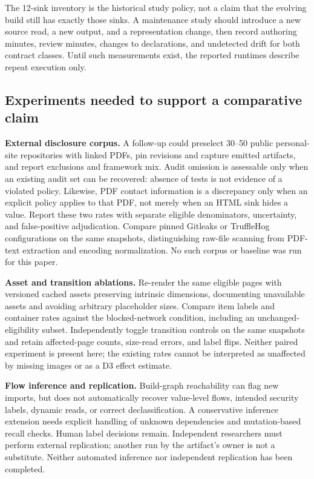 \documentclass[acmsmall,screen,review,anonymous,nonacm]{acmart}
\begin{document}
The 12-sink inventory is the historical study policy, not a claim that the evolving build still has exactly those sinks. A maintenance study should introduce a new source read, a new output, and a representation change, then record authoring minutes, review minutes, changes to declarations, and undetected drift for both contract classes. Until such measurements exist, the reported runtimes describe repeat execution only.

\subsection{Experiments needed to support a comparative claim}
\textbf{External disclosure corpus.} A follow-up could preselect 30--50 public personal-site repositories with linked PDFs, pin revisions and capture emitted artifacts, and report exclusions and framework mix. Audit omission is assessable only when an existing audit set can be recovered: absence of tests is not evidence of a violated policy. Likewise, PDF contact information is a discrepancy only when an explicit policy applies to that PDF, not merely when an HTML sink hides a value. Report these two rates with separate eligible denominators, uncertainty, and false-positive adjudication. Compare pinned Gitleaks or TruffleHog configurations on the same snapshots, distinguishing raw-file scanning from PDF-text extraction and encoding normalization. No such corpus or baseline was run for this paper.

\textbf{Asset and transition ablations.} Re-render the same eligible pages with versioned cached assets preserving intrinsic dimensions, documenting unavailable assets and avoiding arbitrary placeholder sizes. Compare item labels and container rates against the blocked-network condition, including an unchanged-eligibility subset. Independently toggle transition controls on the same snapshots and retain affected-page counts, size-read errors, and label flips. Neither paired experiment is present here; the existing rates cannot be interpreted as unaffected by missing images or as a D3 effect estimate.

\textbf{Flow inference and replication.} Build-graph reachability can flag new imports, but does not automatically recover value-level flows, intended security labels, dynamic reads, or correct declassification. A conservative inference extension needs explicit handling of unknown dependencies and mutation-based recall checks. Human label decisions remain. Independent researchers must perform external replication; another run by the artifact's owner is not a substitute. Neither automated inference nor independent replication has been completed.
\end{document}
